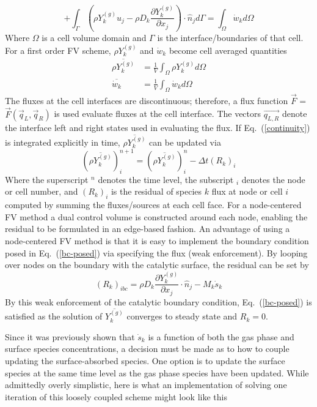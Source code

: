 \documentclass{report}
\newcommand{\eref}[1]{Eq.~(\ref{#1})}
\newcommand{\sk}{\dot{s}_k}
\newcommand{\wk}{\dot{w}_k}
\newcommand{\ry}{{\rho Y_{k}^{(g)}}}
\newcommand{\yk}{{Y_{k}^{(g)}}}
\newcommand{\dint}[1]{\int_{\Omega}{#1} d \Omega}
\newcommand{\fint}[1]{\int_{\Gamma}{#1} d \Gamma}
\newcommand{\flux}{\vec{F}}
\begin{document}
\begin{enumerate}[label=(\alph*)]
\begin{equation}
      + \fint{\left( \ry u_j - \rho D_k
        \frac{\partial Y_{k}^{(g)}}{\partial x_j}\right) \cdot \hat{n}_j }
      = \dint{\wk}
      \label{continuity}
    \end{equation}
    Where $\Omega$ is a cell volume domain and $\Gamma$ is the
    interface/boundaries of that cell.  For a first order FV scheme, $\ry$ and
    $\wk$ become cell averaged quantities
    \begin{align}
      \overline{\ry} &= \frac{1}{V}\dint{\ry} \\
      \overline{\wk} &= \frac{1}{V}\dint{\wk}
      \label{avg-q}
    \end{align}
    The fluxes at the cell interfaces are discontinuous; therefore, a flux function
    $\flux$ = $\flux (\vec{q}_L, \vec{q}_R)$ is used evaluate fluxes at the cell interface.
    The vectors $\vec{q_{L,R}}$ denote the interface left and right states used
    in evaluating the flux. If \eref{continuity} is integrated explicitly in
    time, $\overline{\ry}$ can be updated via
    \begin{equation}
      (\overline{\ry})_{i}^{n+1} = (\overline{\ry})^{n}_i - \Delta t (R_k)_i
      \label{expl-fv}
    \end{equation}
    Where the superscript $^n$ denotes the time level, the subscript $_i$
    denotes the node or cell number, and $(R_k)_i$ is the residual of species
    $k$ flux at node or cell $i$ computed by summing the fluxes/sources at each
    cell face.  For a node-centered FV method a dual control volume is
    constructed around each node, enabling the residual to be formulated in an
    edge-based fashion.  An advantage of using a node-centered FV method is that
    it is easy to implement the boundary condition posed in \eref{bc-posed} via
    specifying the flux (weak enforcement).  By looping over nodes on the
    boundary with the catalytic surface, the residual can be set by
    \begin{equation}
      (R_k)_{ibc} = \rho D_k \frac{\partial Y_k^{(g)}}{\partial x_j} \cdot \hat{n}_j
      - M_k \sk
      \label{res-bc}
    \end{equation}
    By this weak enforcement of the catalytic boundary condition,
    \eref{bc-posed} is satisfied as the solution of $\overline{\yk}$ converges
    to steady state and $R_k = 0$.

    Since it was previously shown that $\sk$ is a
    function of both the gas phase and surface species concentrations, a
    decision must be made as to how to couple updating the surface-absorbed
    species.  One option is to update the surface species at the same time
    level as the gas phase species have been updated.  While admittedly overly
    simplistic, here is what an implementation of solving one iteration of this
    loosely coupled scheme might look like this


\end{enumerate}
\end{document}

